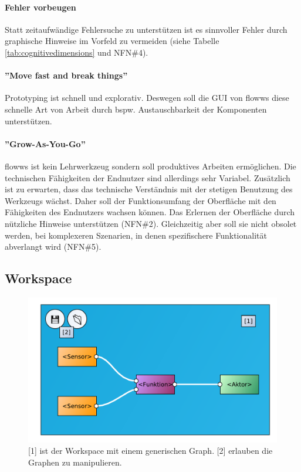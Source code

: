 \paragraph{Fehler vorbeugen} Statt zeitaufwändige Fehlersuche zu unterstützen ist es sinnvoller Fehler durch graphische Hinweise im Vorfeld zu vermeiden (siehe Tabelle \ref{tab:cognitivedimensions} und NFN\#4).

\paragraph{''Move fast and break things''} Prototyping ist schnell und explorativ. Deswegen soll die \ac{GUI} von flowws diese schnelle Art von Arbeit durch bspw. Austauschbarkeit der Komponenten unterstützen.

\paragraph{''Grow-As-You-Go''} flowws ist kein Lehrwerkzeug sondern soll produktives Arbeiten ermöglichen. Die technischen Fähigkeiten der Endnutzer sind allerdings sehr Variabel. Zusätzlich ist zu erwarten, dass das technische Verständnis mit der stetigen Benutzung des Werkzeugs wächst. Daher soll der Funktionsumfang der Oberfläche mit den Fähigkeiten des Endnutzers wachsen können. Das Erlernen der Oberfläche durch nützliche Hinweise unterstützen (NFN\#2). Gleichzeitig aber soll sie nicht obsolet werden, bei komplexeren Szenarien, in denen spezifischere Funktionalität abverlangt wird (NFN\#5).


\subsection{Workspace}
\begin{figure}[h]
  \centering
  \includegraphics[width=.75\textwidth]{bilder/chapter4/chapter4_3/workspace.pdf}
  \caption{[1] ist der Workspace mit einem generischen Graph. [2] erlauben die Graphen zu manipulieren.}
  \label{fig:genericlink}
\end{figure}


